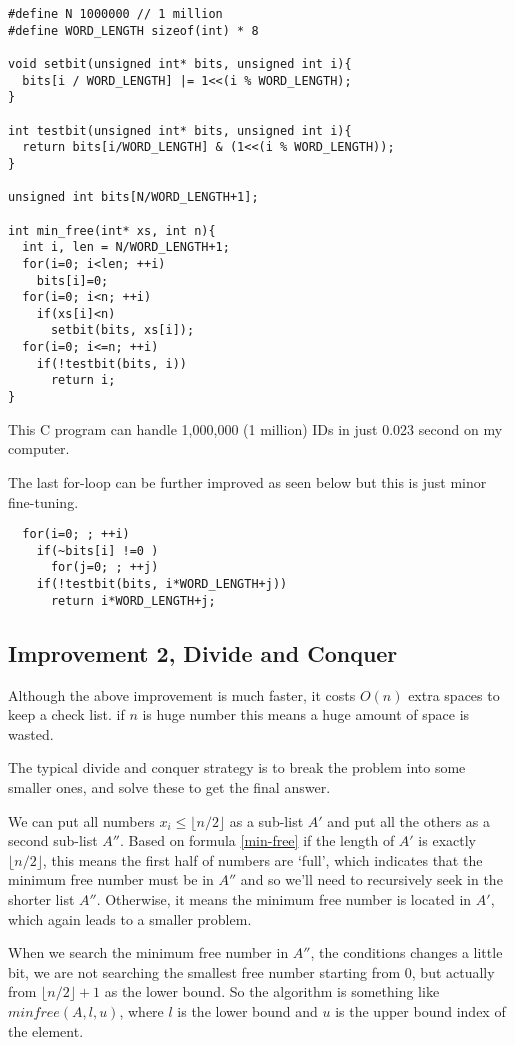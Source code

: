 \documentclass{article}
\begin{document}
\lstset{language = C}
\begin{lstlisting}
#define N 1000000 // 1 million
#define WORD_LENGTH sizeof(int) * 8

void setbit(unsigned int* bits, unsigned int i){
  bits[i / WORD_LENGTH] |= 1<<(i % WORD_LENGTH);
}

int testbit(unsigned int* bits, unsigned int i){
  return bits[i/WORD_LENGTH] & (1<<(i % WORD_LENGTH));
}

unsigned int bits[N/WORD_LENGTH+1];

int min_free(int* xs, int n){
  int i, len = N/WORD_LENGTH+1;
  for(i=0; i<len; ++i)
    bits[i]=0;
  for(i=0; i<n; ++i)
    if(xs[i]<n)
      setbit(bits, xs[i]);
  for(i=0; i<=n; ++i)
    if(!testbit(bits, i))
      return i;
}
\end{lstlisting}

This C program can handle 1,000,000 (1 million) IDs in just 0.023 second
on my computer.

The last for-loop can be further improved as seen below but this is just minor
fine-tuning.

\begin{lstlisting}
  for(i=0; ; ++i)
    if(~bits[i] !=0 )
      for(j=0; ; ++j)
	if(!testbit(bits, i*WORD_LENGTH+j))
	  return i*WORD_LENGTH+j;
\end{lstlisting}

\subsection{Improvement 2, Divide and Conquer}
Although the above improvement is much faster, it costs $O(n)$ extra
spaces to keep a check list. if $n$ is huge number this means
a huge amount of space is wasted.

The typical divide and conquer strategy is to break the problem
into some smaller ones, and solve these to get the final answer.

We can put all numbers $x_i \leq \lfloor n/2 \rfloor$ as a sub-list $A'$ and put all the others as
a second sub-list $A''$. Based on formula \ref{min-free} if the length of $A'$ is exactly $\lfloor n/2 \rfloor$, this means
the first half of numbers are `full', which indicates that the
minimum free number must be in $A''$ and so we'll need to recursively seek
in the shorter list $A''$. Otherwise, it means the minimum free
number is located in $A'$, which again leads to a smaller problem.

When we search the minimum free number in $A''$, the conditions changes
a little bit, we are not searching the smallest free number starting from
$0$, but actually from $\lfloor n/2 \rfloor + 1$ as the lower bound.
So the algorithm is something like $minfree(A, l, u)$, where $l$ is
the lower bound and $u$ is the upper bound index of the element.
\end{document}
